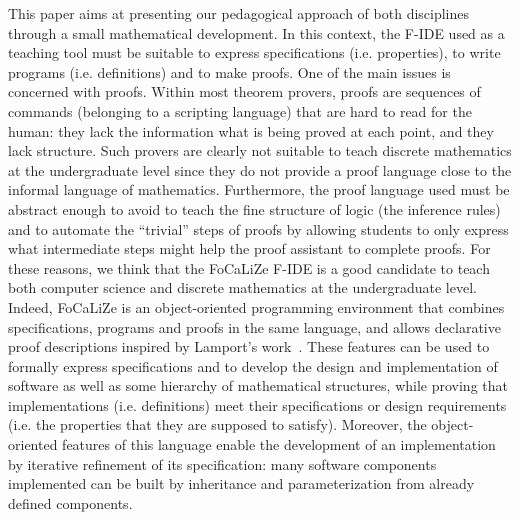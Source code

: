 \documentclass[submission,copyright,creativecommons]{eptcs}
\def\focalize{FoCaLiZe \mbox{}}
\begin{document}
This paper aims at presenting our pedagogical approach of both
disciplines through a small mathematical development.
In this context, the F-IDE used as a teaching tool
must be suitable to express specifications
(i.e. properties), to write programs (i.e. definitions) and to make
proofs. One of the main issues is concerned with proofs. Within most theorem
provers, proofs are sequences of commands (belonging to a scripting
language)  that are hard to read for the
human: they lack the information what is
being proved at each point, and they lack structure.
Such provers are clearly not suitable to teach discrete mathematics at
the undergraduate level
since they do not provide a
proof language
close to the informal language of mathematics.
Furthermore, the proof language used must be abstract enough
to avoid to teach the fine structure of logic (the inference rules)
and to automate the ``trivial'' steps of proofs by allowing students
to only express what intermediate steps
might help the proof assistant to complete proofs.
For these reasons, we think that  the \focalize\cite{foc03} F-IDE is a good candidate
to teach both computer science and discrete mathematics at the
undergraduate level.
Indeed, \focalize is an object-oriented programming environment that
combines specifications, programs and proofs in the same language, and
allows declarative proof descriptions inspired by Lamport's
work~\cite{Lamport95,chaudhuri:proof}. 
These
features can be used to
formally express specifications and to develop
the design and implementation of software as well as some hierarchy of
mathematical structures,
while proving that implementations (i.e. definitions) meet their specifications or design
requirements (i.e. the properties that they are supposed to satisfy).
Moreover, the object-oriented
features of this language enable the development of an implementation
by iterative refinement of its specification: 
many software
components implemented can be built by
inheritance and parameterization from already defined components.

\end{document}

